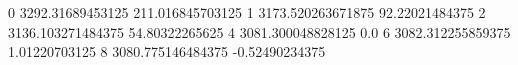 0 3292.31689453125 211.016845703125
1 3173.520263671875 92.22021484375
2 3136.103271484375 54.80322265625
4 3081.300048828125 0.0
6 3082.312255859375 1.01220703125
8 3080.775146484375 -0.52490234375
